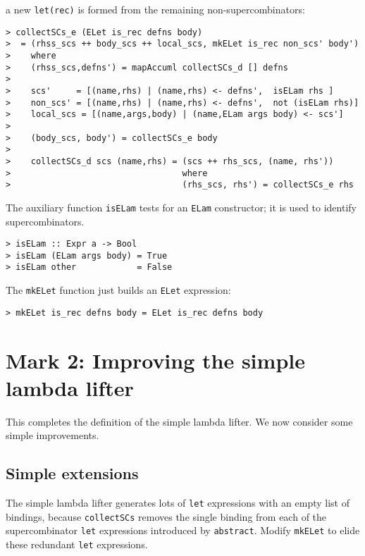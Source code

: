a new \mbox{\tt let(rec)} is formed from the remaining non-supercombinators:
\begin{verbatim}
> collectSCs_e (ELet is_rec defns body)
>  = (rhss_scs ++ body_scs ++ local_scs, mkELet is_rec non_scs' body')
>    where
>    (rhss_scs,defns') = mapAccuml collectSCs_d [] defns
>
>    scs'     = [(name,rhs) | (name,rhs) <- defns',  isELam rhs ]
>    non_scs' = [(name,rhs) | (name,rhs) <- defns',  not (isELam rhs)]
>    local_scs = [(name,args,body) | (name,ELam args body) <- scs']
>
>    (body_scs, body') = collectSCs_e body
>
>    collectSCs_d scs (name,rhs) = (scs ++ rhs_scs, (name, rhs'))
>                                  where
>                                  (rhs_scs, rhs') = collectSCs_e rhs
\end{verbatim}
The auxiliary function \mbox{\tt isELam} tests for an \mbox{\tt ELam} constructor; it is
used to identify supercombinators.
\begin{verbatim}
> isELam :: Expr a -> Bool
> isELam (ELam args body) = True
> isELam other            = False
\end{verbatim}
%
%
%
The \mbox{\tt mkELet} function just builds an \mbox{\tt ELet} expression:
\begin{verbatim}
> mkELet is_rec defns body = ELet is_rec defns body
\end{verbatim}
%
        \section{Mark 2: Improving the simple lambda lifter}
        \label{sect:simple-lambdalift-improvements}

This completes the definition of the simple lambda lifter.
We now consider some simple improvements.

\subsection{Simple extensions}

\begin{exercise}
The simple lambda lifter generates lots of \mbox{\tt let} expressions with an
empty list of bindings, because \mbox{\tt collectSCs} removes the single binding
from each of the supercombinator \mbox{\tt let} expressions introduced by \mbox{\tt abstract}.
Modify \mbox{\tt mkELet} to elide these redundant \mbox{\tt let} expressions.
\end{exercise}

